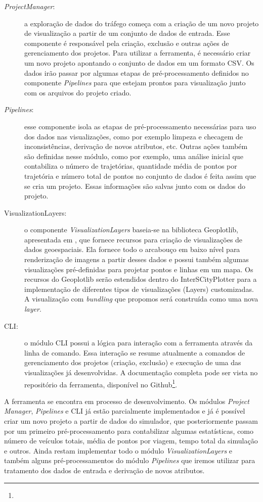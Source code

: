 \begin{description}
\item[\emph{ProjectManager}:] a exploração de dados do tráfego começa com a
criação de um novo projeto de visualização a partir de um conjunto de dados de
entrada. Esse componente é responsável pela criação, exclusão e outras ações de
gerenciamento dos projetos. Para utilizar a ferramenta, é necessário criar um
novo projeto apontando o conjunto de dados em um formato CSV. Os dados irão
passar por algumas etapas de pré-processamento definidos no componente
\emph{Pipelines} para que estejam prontos para visualização junto com os
arquivos do projeto criado.

  \item[\emph{Pipelines}:] esse componente isola as etapas de pré-processamento
necessárias para uso dos dados nas visualizações, como por exemplo limpeza e
checagem de inconsistências, derivação de novos atributos, etc.  Outras ações
também são definidas nesse módulo, como por exemplo, uma análise inicial que
contabiliza o número de trajetórias, quantidade média de pontos por trajetória
e número total de pontos no conjunto de dados é feita assim que se cria um
projeto. Essas informações são salvas junto com os dados do projeto.

  \item[VisualizationLayers:] o componente \emph{VisualizationLayers} baseia-se
na biblioteca Geoplotlib, apresentada em \citet{Andrea2016}, que fornece
recursos para criação de visualizações de dados geoespaciais. Ela fornece todo
o arcabouço em baixo nível para renderização de imagens a partir desses dados e
possui também algumas visualizações pré-definidas para projetar pontos e linhas
em um mapa. Os recursos do Geoplotlib serão estendidos dentro do
InterSCityPlotter para a implementação de diferentes tipos de visualizações
(Layers) customizadas. A visualização com \emph{bundling} que propomos será
construída como uma nova \emph{layer}.

  \item[CLI:] o módulo CLI possui a lógica para interação com a ferramenta
através da linha de comando. Essa interação se resume atualmente a comandos de
gerenciamento dos projetos (criação, exclusão) e execução de uma das
visualizações já desenvolvidas. A documentação completa pode ser vista no
repositório da ferramenta, disponível no
Github\footnote{}.
\end{description}

  A ferramenta se encontra em processo de desenvolvimento. Os módulos
\emph{Project Manager}, \emph{Pipelines} e CLI já estão parcialmente
implementados e já é possível criar um novo projeto a partir de dados do
simulador, que posteriormente passam por um primeiro pré-processamento para
contabilizar algumas estatísticas, como número de veículos totais, média de
pontos por viagem, tempo total da simulação e outros. Ainda restam implementar
todo o módulo \emph{VisualizationLayers} e também alguns pré-processamentos do
módulo \emph{Pipelines} que iremos utilizar para tratamento dos dados de
entrada e derivação de novos atributos.

